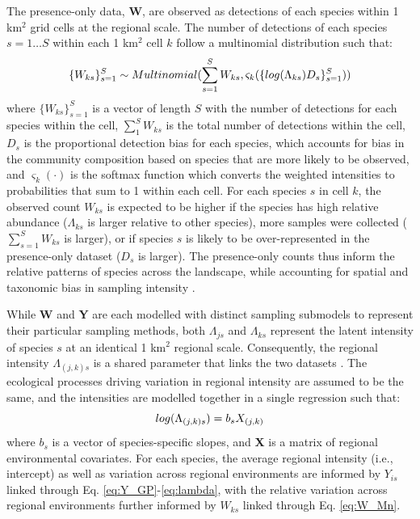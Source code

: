 \documentclass[preprint,review,times,12pt]{elsarticle}
\begin{document}
The presence-only data, \textbf{W}, are observed as detections of each species within 1 km$^2$ grid cells at the regional scale. The number of detections of each species $s=1 \dots S$ within each 1 km$^2$ cell $k$ follow a multinomial distribution such that:
    \begin{equation}
        \{W_{ks}\}_{s=1}^{S} \sim Multinomial(\sum_{s=1}^{S} W_{ks} , \varsigma_k(\{log(\Lambda_{ks})D_s\}_{s=1}^{S})) \\
        \label{eq:W_Mn}
    \end{equation}
where $\{W_{ks}\}_{s=1}^{S}$ is a vector of length $S$ with the number of detections for each species within the cell, $\sum_{1}^{S} W_{ks}$ is the total number of detections within the cell, $D_s$ is the proportional detection bias for each species, which accounts for bias in the community composition based on species that are more likely to be observed, and $\varsigma_k(\cdot)$ is the softmax function which converts the weighted intensities to probabilities that sum to 1 within each cell. For each species $s$ in cell $k$, the observed count $W_{ks}$ is expected to be higher if the species has high relative abundance ($\Lambda_{ks}$ is larger relative to other species), more samples were collected ($\sum_{s=1}^{S} W_{ks}$ is larger), or if species $s$ is likely to be over-represented in the presence-only dataset ($D_s$ is larger). The presence-only counts thus inform the relative patterns of species across the landscape, while accounting for spatial and taxonomic bias in sampling intensity \citep{Isaac2014}.

While \textbf{W} and \textbf{Y} are each modelled with distinct sampling submodels to represent their particular sampling methods, both $\Lambda_{js}$ and $\Lambda_{ks}$ represent the latent intensity of species $s$ at an identical 1 km$^2$ regional scale. Consequently, the regional intensity $\Lambda_{(j,k)s}$ is a shared parameter that links the two datasets \citep{Hefley2016,Isaac2019,Miller2019}. The ecological processes driving variation in regional intensity are assumed to be the same, and the intensities are modelled together in a single regression such that:
    \begin{equation}
        log(\Lambda_{(j,k)s}) = b_s X_{(j,k)} \\
        \label{eq:LAMBDA}
    \end{equation}
where $b_s$ is a vector of species-specific slopes, and \textbf{X} is a matrix of regional environmental covariates. For each species, the average regional intensity (i.e., intercept) as well as variation across regional environments are informed by $Y_{is}$ linked through Eq. \ref{eq:Y_GP}-\ref{eq:lambda}, with the relative variation across regional environments further informed by $W_{ks}$ linked through Eq. \ref{eq:W_Mn}.  
\end{document}
